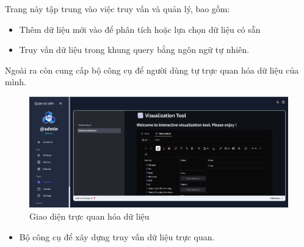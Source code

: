 Trang này tập trung vào việc truy vấn và quản lý, bao gồm:
\begin{itemize}
    \item Thêm dữ liệu   mới vào để phân tích hoặc lựa chọn dữ liệu có sẵn
    \item Truy vấn dữ liệu trong khung query bằng ngôn ngữ tự nhiên.
\end{itemize}

Ngoài ra còn cung cấp bộ công cụ để người dùng tự trực quan hóa dữ liệu của mình.
\begin{figure}[H]
    \centering
    \includegraphics[width=0.75\linewidth]{images/admin2.jpg}
    \vspace{0.6cm}
    \caption{Giao diện trực quan hóa dữ liệu}
\end{figure}

\begin{itemize}
    \item Bộ công cụ để xây dựng truy vấn dữ liệu trực quan.
\end{itemize}
